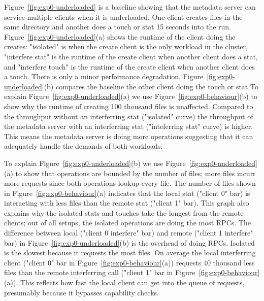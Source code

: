 Figure~\ref{fig:exp0-underloaded} is a baseline showing that the metadata
server can service multiple clients when it is underloaded. One client creates
files in the same directory and another does a touch or stat 15 seconds into
the run. Figure~\ref{fig:exp0-underloaded}(a) shows the runtime of the client
doing the creates: "isolated" is when the create client is the only workload in
the cluster, "interfere stat" is the runtime of the create client when another
client does a stat, and "interfere touch" is the runtime of the create client
when another client does a touch. There is only a minor performance
degradation. Figure~\ref{fig:exp0-underloaded}(b) compares the baseline
the other client doing the touch or stat
%
%
%
%
%
To explain Figure~\ref{fig:exp0-underloaded}(a) we use
Figure~\ref{fig:exp0-behaviour}(b) to show why the runtime of creating 100
thousand files is unaffected. Compared to the throughput without an
interferring stat ("isolated" curve) the throughput of the metadata server with
an interferring stat ("inteferring stat" curve) is higher. This means the
metadata server is doing more operations suggesting that it can adequately
handle the demands of both workloads.  

To explain Figure~\ref{fig:exp0-underloaded}(b) we use
Figure~\ref{fig:exp0-underloaded}(a) to show that operations are bounded by the
number of files; more files incurr more requests since both operations lookup
every file. The number of files shown in Figure~\ref{fig:exp0-behaviour}(a)
indicates that the local stat ("client 0" bar) is interacting with less files
than the remote stat ("client 1" bar). This graph also explains why the
isolated stats and touches take the longest from the remote clients; out of all
setups, the isolated operations are doing the most RPCs.  The difference
between local ("client 0 interfere" bar) and remote ("client 1 interfere" bar)
in Figure~\ref{fig:exp0-underloaded}(b) is the overhead of doing RPCs.
Isolated is the slowest because it requests the most files. On average the
local interferring client ("client 0" bar in
Figure~\ref{fig:exp0-behaviour}(a)) requests 40 thousand less files than the
remote interferring call ("client 1" bar in
Figure~\ref{fig:exp0-behaviour}(a)). This reflects how fast the local client
can get into the queue of requests, presumably because it bypasses capability
checks.

